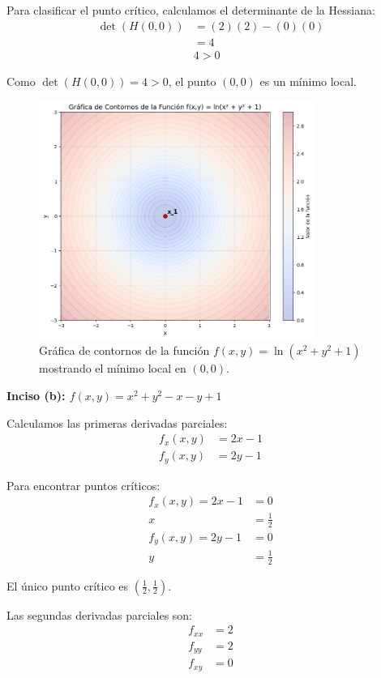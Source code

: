 \documentclass{article}
\begin{document}
Para clasificar el punto crítico, calculamos el determinante de la Hessiana:
\begin{align}
\det(H(0,0)) &= (2)(2) - (0)(0) \\
&= 4 \\
&4>0
\end{align}

Como $\det(H(0,0)) = 4 > 0$, el punto $(0,0)$ es un mínimo local.

\begin{figure}[h]
\centering
\includegraphics[width=0.8\textwidth]{images/6a_plot.png}
\caption{Gráfica de contornos de la función $f(x,y) = \ln(x^{2} + y^{2} + 1)$ mostrando el mínimo local en $(0,0)$.}
\label{fig:6a_contour}
\end{figure}

\textbf{Inciso (b): $f(x,y) = x^{2} + y^{2} - x - y + 1$}

Calculamos las primeras derivadas parciales:
\begin{align}
f_x(x,y) &= 2x - 1 \\
f_y(x,y) &= 2y - 1
\end{align}

Para encontrar puntos críticos:
\begin{align}
f_x(x,y) = 2x - 1 &= 0 \\
x &= \frac{1}{2} \\
f_y(x,y) = 2y - 1 &= 0 \\
y &= \frac{1}{2}
\end{align}

El único punto crítico es $\left(\frac{1}{2}, \frac{1}{2}\right)$.

Las segundas derivadas parciales son:
\begin{align}
f_{xx} &= 2 \\
f_{yy} &= 2 \\
f_{xy} &= 0
\end{align}
\end{document}
